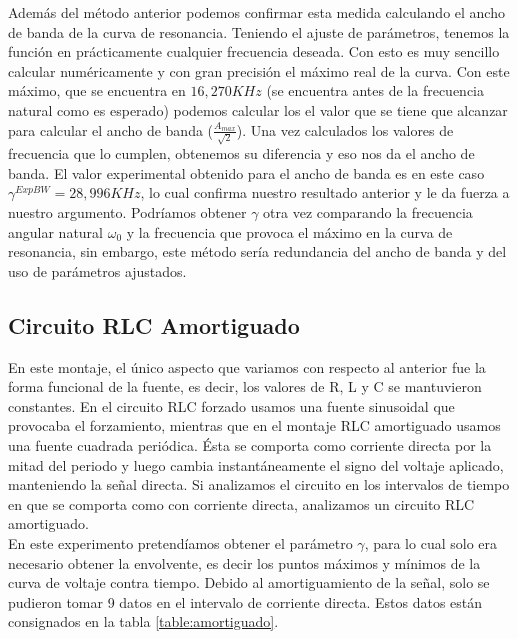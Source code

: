 \documentclass[%
 reprint,
 amsmath,amssymb,
 aps,
]{revtex4-1}
\begin{document}
Adem\'as del m\'etodo anterior podemos confirmar esta medida calculando el ancho de banda de la curva de resonancia. Teniendo el ajuste de par\'ametros, tenemos la funci\'on en pr\'acticamente cualquier frecuencia deseada. Con esto es muy sencillo calcular num\'ericamente y con gran precisi\'on el m\'aximo real de la curva. Con este m\'aximo, que se encuentra en $16,270KHz$ (se encuentra antes de la frecuencia natural como es esperado) podemos calcular los el valor que se tiene que alcanzar para calcular el ancho de banda ($\frac{A_{max}}{\sqrt{2}}$). Una vez calculados los valores de frecuencia que lo cumplen, obtenemos su diferencia y eso nos da el ancho de banda. El valor experimental obtenido para el ancho de banda es en este caso $\gamma^{ExpBW} = 28,996KHz$, lo cual confirma nuestro resultado anterior y le da fuerza a nuestro argumento. Podr\'iamos obtener $\gamma$ otra vez comparando la frecuencia angular natural $\omega_0$ y la frecuencia que provoca el m\'aximo en la curva de resonancia, sin embargo, este m\'etodo ser\'ia redundancia del ancho de banda y del uso de par\'ametros ajustados.\\
 

\subsection{\label{sec:level2}Circuito RLC Amortiguado}
En este montaje, el \'unico aspecto que variamos con respecto al anterior fue la forma funcional de la fuente, es decir, los valores de R, L y C se mantuvieron constantes. En el circuito RLC forzado usamos una fuente sinusoidal que provocaba el forzamiento, mientras que en el montaje RLC amortiguado usamos una fuente cuadrada peri\'odica. \'Esta se comporta como corriente directa por la mitad del periodo y luego cambia instant\'aneamente el signo del voltaje aplicado, manteniendo la señal directa. Si analizamos el circuito en los intervalos de tiempo en que se comporta como con corriente directa, analizamos un circuito RLC amortiguado.\\ 

En este experimento pretend\'iamos obtener el par\'ametro $\gamma$, para lo cual solo era necesario obtener la envolvente, es decir los puntos m\'aximos y m\'inimos de la curva de voltaje contra tiempo. Debido al amortiguamiento de la señal, solo se pudieron tomar 9 datos en el intervalo de corriente directa. Estos datos est\'an consignados en la tabla \ref{table:amortiguado}.\\
\end{document}
